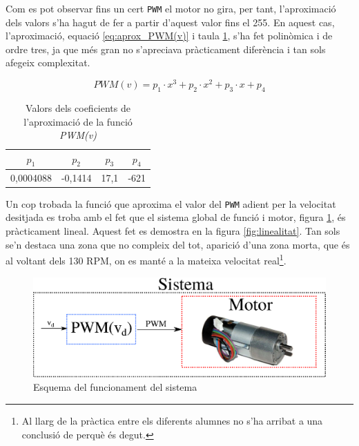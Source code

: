 \documentclass[12pt,a4paper,final,twoside,openright]{report}
\begin{document}
Com es pot observar fins un cert \texttt{PWM} el motor no gira, per tant, l'aproximació dels valors s'ha hagut de fer a partir d'aquest valor fins el 255. En aquest cas, l'aproximació, equació \eqref{eq:aprox_PWM(v)} i taula \ref{tab:coef_PWM(v)}, s'ha fet polinòmica i de ordre tres, ja que més gran no s'apreciava pràcticament diferència i tan sols afegeix complexitat. 

\vspace{-10pt}
\begin{equation}\label{eq:aprox_PWM(v)}
PWM(v) = p_1\cdot x^3 + p_2 \cdot x^2 + p_3 \cdot x + p_4
\end{equation}

\begin{table}[h]
\begin{center}
\begin{tabular}{|c|c|c|c|}
\hline
$p_1$ & $p_2$ & $p_3$ & $p_4$\\ \hline
0,0004088 & -0,1414 & 17,1 & -621\\ \hline
\end{tabular}
\caption{Valors dels coeficients de l'aproximació de la funció \textit{PWM(v)}\label{tab:coef_PWM(v)}}
\end{center}
\end{table}

\vspace{-15pt}
Un cop trobada la funció que aproxima el valor del \texttt{PWM} adient per la velocitat desitjada es troba amb el fet que el sistema global de funció i motor, figura \ref{fig:esqSistPWM-Motor}, és pràcticament lineal. Aquest fet es demostra en la figura \ref{fig:linealitat}. Tan sols se'n destaca una zona que no compleix del tot, aparició d'una zona morta, que és al voltant dels 130 RPM, on es manté a la mateixa velocitat real\footnote{Al llarg de la pràctica entre els diferents alumnes no s'ha arribat a una conclusió de perquè és degut.}.

\vspace{-5pt}
\begin{figure}[h]
\centering
\includegraphics[scale=1]{Imatges/esqPWM-Motor.eps}
\caption{Esquema del funcionament del sistema\label{fig:esqSistPWM-Motor}}
\end{figure}
\end{document}

